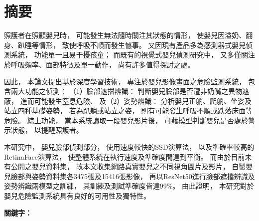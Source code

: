 \documentclass[class=NCU_thesis, crop=false]{standalone}
\begin{document}
\chapter{摘要}
照護者在照顧嬰兒時，
可能發生無法隨時關注其狀態的情形，
使嬰兒因溢奶、翻身、趴睡等情形，
致使呼吸不順而發生憾事。
又因現有產品多為感測器式嬰兒偵測系統，
功能單一且易干擾孩童；
而既有的視覺式嬰兒偵測研究中，
又多僅關注於呼吸頻率、面部特徵及單一動作，
尚有許多值得探討之處。

因此，
本論文提出基於深度學習技術，
專注於嬰兒影像畫面之危險監測系統，
包含兩大功能之偵測：
（1）臉部遮擋辨識：
判斷嬰兒臉部是否遭非奶嘴之異物遮蔽，
進而可能發生窒息危險、
及（2）姿勢辨識：
分析嬰兒正躺、爬躺、坐姿及站立四種基礎姿勢，
若為趴躺或站立之姿，
則有可能發生呼吸不順或跌落床面等危險。
綜上功能，
當本系統讀取一段嬰兒影片後，
可藉模型判斷嬰兒是否處於警示狀態，
以提醒照護者。

本研究中，
嬰兒臉部偵測部分，
使用速度較快的SSD演算法，
以及準確率較高的RetinaFace演算法，
使整體系統在執行速度及準確度間達到平衡。
而由於目前未有公開之嬰兒資料集，
故本文收集網路真實嬰兒之不同視角圖片及影片，
自製嬰兒臉部與姿勢資料集各3475張及15416張影像，
再以ResNet50進行臉部遮擋辨識及姿勢辨識兩模型之訓練，
其訓練及測試準確度皆達99\%。
由此證明，
本研究對於嬰兒危險監測系統具有良好的可用性及獨特性。

\vspace{2em}
\noindent \textbf{關鍵字：} \keywordsZh{} %
\end{document}
